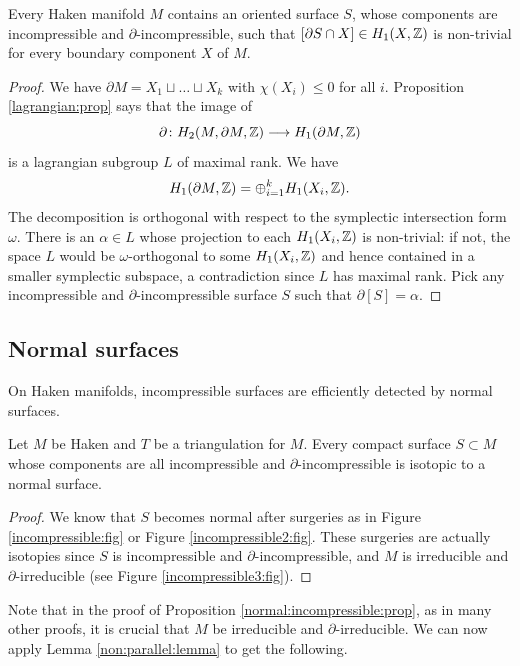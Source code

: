 \begin{lemma} \label{chiappa:tutto:lemma}
Every Haken manifold $M$ contains an oriented surface $S$, whose components are incompressible and $\partial$-incompressible, such that $[\partial S\cap X]\in H_1(X,\mathbb{Z})$ is non-trivial for every boundary component $X$ of $M$.
\end{lemma}
\begin{proof}
We have $\partial M = X_1\sqcup \ldots \sqcup X_k$ with $\chi(X_i)\leqslant 0$ for all $i$. Proposition \ref{lagrangian:prop} says that the image of 
$$\partial \colon H_2(M,\partial M, \mathbb{Z}) \longrightarrow H_1(\partial M,\mathbb{Z})$$
is a lagrangian subgroup $L$ of maximal rank. We have 
$$H_1(\partial M, \mathbb{Z}) = \oplus_{i=1}^k H_1(X_i, \mathbb{Z}).$$
The decomposition is orthogonal with respect to the symplectic intersection form $\omega$. There is an $\alpha\in L$ whose projection to each $H_1(X_i,\mathbb{Z})$ is non-trivial: if not, the space $L$ would be $\omega$-orthogonal to some $H_1(X_i,\mathbb{Z})$ and hence contained in a smaller symplectic subspace, a contradiction since $L$ has maximal rank.
Pick any incompressible and $\partial$-incompressible surface $S$ such that $\partial [S] = \alpha$.
\end{proof}

\subsection{Normal surfaces}
On Haken manifolds, incompressible surfaces are efficiently detected by normal surfaces.  

\begin{prop} \label{normal:incompressible:prop}
Let $M$ be Haken and $T$ be a triangulation for $M$. Every compact surface $S\subset M$ whose components are all incompressible and $\partial$-incompressible is isotopic to a normal surface.
\end{prop}
\begin{proof}
We know that $S$ becomes normal after surgeries as in Figure \ref{incompressible:fig} or Figure \ref{incompressible2:fig}. These surgeries are actually isotopies since $S$ is incompressible and $\partial$-incompressible, and $M$ is irreducible and $\partial$-irreducible (see Figure \ref{incompressible3:fig}).
\end{proof}

Note that in the proof of Proposition \ref{normal:incompressible:prop}, as in many other proofs, it is crucial that $M$ be irreducible and $\partial$-irreducible.
We can now apply Lemma \ref{non:parallel:lemma} to get the following.

